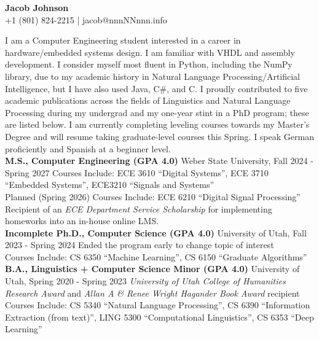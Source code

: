 \documentclass[a4paper,10pt]{article}
\newcommand{\resumeSection}[1]{\vspace{2pt}\noindent{\Large \textbf{#1}}\vspace{1pt}\newline}
\newcommand{\resumeSubsection}[2]{\noindent\textbf{#1} \hfill #2\newline}
\begin{document}
\begin{center}
    {\LARGE \textbf{Jacob Johnson}} \\
    \vspace{2pt}
    +1 (801) 824-2215  | jacob@nnnNNnnn.info
\end{center}

\resumeSection{Overview}
    \indent I am a Computer Engineering student interested in a career in hardware/embedded systems design. I am familiar with VHDL and assembly development. I consider myself most fluent in Python, including the NumPy library, due to my academic history in Natural Language Processing/Artificial Intelligence, but I have also used Java, C\#, and C. I proudly contributed to five academic publications across the fields of Linguistics and Natural Language Processing during my undergrad and my one-year stint in a PhD program; these are listed below. I am currently completing leveling courses towards my Master's Degree and will resume taking graduate-level courses this Spring. I speak German proficiently and Spanish at a beginner level. \\


\resumeSection{Education}
    \resumeSubsection{M.S., Computer Engineering (GPA 4.0)}{Weber State University, Fall 2024 - Spring 2027}
        Courses Include: ECE 3610 ``Digital Systems'', ECE 3710 ``Embedded Systems'', ECE3210 ``Signals and Systems'' \\
        Planned (Spring 2026) Courses Include: ECE 6210 ``Digital Signal Processing''\\
        Recipient of an \textit{ECE Department Service Scholarship} for implementing homeworks into an in-house online LMS. \\
    \resumeSubsection{Incomplete Ph.D., Computer Science (GPA 4.0)}{University of Utah, Fall 2023 - Spring 2024}
        Ended the program early to change topic of interest \\
        Courses Include: CS 6350 ``Machine Learning'', CS 6150 ``Graduate Algorithms'' \\
    \resumeSubsection{B.A., Linguistics + Computer Science Minor (GPA 4.0)}{University of Utah, Spring 2020 - Spring 2023}
        \textit{University of Utah College of Humanities Research Award} and \textit{Allan A \& Renee Wright Hagander Book Award} recipient\\
        Courses Include: CS 5340 ``Natural Language Processing'', CS 6390 ``Information Extraction (from text)'', LING 5300 ``Computational Linguistics'', CS 6353 ``Deep Learning'' \\
\end{document}
